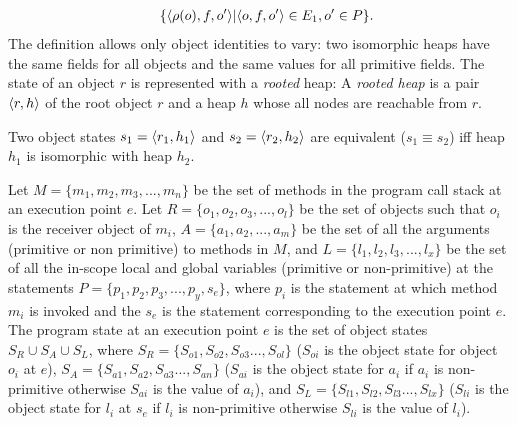 {{\begin{eqnarray}
    &   & \{ \langle \rho(o), f, o' \rangle | \langle o, f, o' \rangle \in E_1, o' \in P \}. \nonumber
\end{eqnarray}
}
 The definition allows only object identities to vary:
two isomorphic heaps have the same fields for all objects and the
same values for all primitive fields.
{
The state of an object $r$ is represented with a \emph{rooted} heap:
A \emph{rooted heap} is a pair $\langle r, h \rangle$ of the root object $r$ and a
heap $h$ whose all nodes are reachable from $r$.
}

{
Two object states $s_1=\langle r_1, h_1 \rangle$ and $s_2=\langle r_2, h_2 \rangle$ are equivalent ($s_1 \equiv s_2$)
iff heap $h_1$ is isomorphic with heap $h_2$.
}
}

\vspace{-0.3cm}
\vspace{-0.6cm}
{
Let $M = \{m_1, m_2, m_3,..., m_n\}$ be the set of methods in 
the program call stack at an execution point $e$. 
Let $R = \{o_1, o_2, o_3,..., o_l\}$ be the set of objects such that $o_i$ is the 
receiver object of $m_i$, $A = \{ a_1, a_2,..., a_m\}$ be the set of all the arguments 
(primitive or non primitive) to methods in $M$, and 
$L= \{l_1, l_2, l_3,..., l_x\}$ be the set of all the in-scope local and global variables (primitive or non-primitive) 
at the statements  
$P = \{p_1, p_2, p_3,..., p_y, s_e\}$, where $p_i$ is the statement at which method $m_i$ is invoked and the 
$s_e$ is the statement corresponding to the execution point $e$.
The program state at an execution point $e$ is the set of object states $S_R \cup S_A \cup S_L$, where 
 $S_R = \{S_{o1}, S_{o2}, S_{o3}..., S_{ol}\}$ ($S_{oi}$
is the object state for object $o_i$ at $e$), 
 $S_A = \{S_{a1}, S_{a2}, S_{a3}..., S_{an}\}$ 
($S_{ai}$ is the object state for $a_i$ if $a_i$ is non-primitive otherwise 
$S_{ai}$ is the value of $a_i$), and $S_L = \{S_{l1}, S_{l2}, S_{l3}..., S_{lx}\}$ 
($S_{li}$ is the object state for $l_i$ at $s_e$ if $l_i$ is non-primitive otherwise 
$S_{li}$ is the value of $l_i$). 
}

